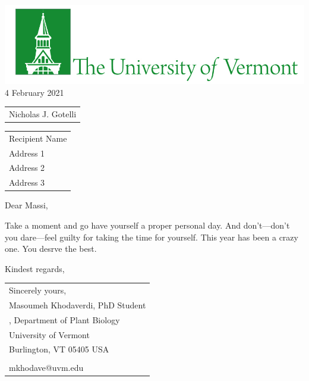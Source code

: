 \documentclass[10pt]{article}\usepackage[]{graphicx}\usepackage[]{color}
\begin{document}
\raggedright %
\includegraphics[scale=2]{UVMLogoSolid7484.jpg}\\ %

 \hfill\hfill\hfill %
 4 February 2021\\[10pt]  %
 
\begin{tabular}{l@{}}
  Nicholas J. Gotelli \\
\end{tabular}

\begin{tabular}{@{}l}
Recipient Name\\
Address 1\\
Address 2\\
Address 3
\end{tabular}


Dear Massi,

Take a moment and go have yourself a proper personal day. And don't—don't you dare—feel guilty for taking the time for yourself. This year has been a crazy one. You desrve the best.

Kindest regards,


\lipsum[1-2]





\begin{tabular}{@{}l}
Sincerely yours,\\
Masoumeh Khodaverdi, PhD Student\\
, Department of Plant Biology\\
University of Vermont\\
Burlington, VT 05405 USA\\
\\
mkhodave@uvm.edu\\

\end{tabular}
\end{document}

